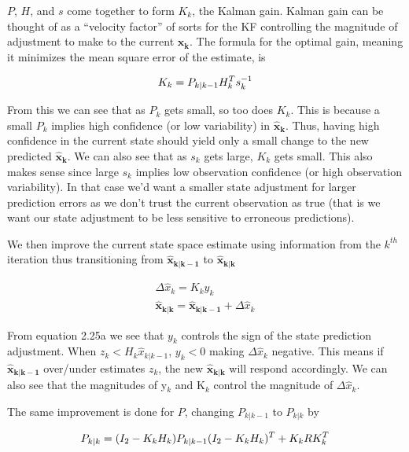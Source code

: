   $P$, $H$, and $s$ come together to form $K_{k}$, the Kalman gain. Kalman gain can be thought of as a ``velocity factor'' of sorts for the KF controlling the magnitude of adjustment to make to the current $\bm{\hat{x}_{k}}$. The formula for the optimal gain, meaning it minimizes the mean square error of the estimate, is  
  
    \begin{equation}
  \centering
    K_{k} = P_{k|k-1}H_{k}^{T}s_{k}^{-1}
  \end{equation}
  
  From this we can see that as $P_{k}$ gets small, so too does $K_{k}$. This is because a small $P_{k}$ implies high confidence (or low variability) in $\bm{\hat{x}_{k}}$. Thus, having high confidence in the current state should yield only a small change to the new predicted $\bm{\hat{x}_{k}}$. We can also see that as $s_{k}$ gets large, $K_{k}$ gets small. This also makes sense since large $s_{k}$ implies low observation confidence (or high observation variability). In that case we'd want a smaller state adjustment for larger prediction errors as we don't trust the current observation as true (that is we want our state adjustment to be less sensitive to erroneous predictions).
  
  We then improve the current state space estimate using information from the $k^{th}$ iteration thus transitioning from $\bm{\hat{x}_{k|k-1}}$ to $\bm{\hat{x}_{k|k}}$
  
  \begin{subequations}
  \begin{align}
    \Delta\hat{x}_{k} = K_{k}y_{k} \\
    \bm{\hat{x}_{k|k}} = \bm{\hat{x}_{k|k-1}} + \Delta\hat{x}_{k}
    \end{align}
   \end{subequations}

From equation 2.25a we see that $y_{k}$ controls the sign of the state prediction adjustment. When $z_{k} < H_{k}\hat{x}_{k|k-1}$, $y_{k} < 0$ making $\Delta\hat{x}_{k}$ negative. This means if $\bm{\hat{x}_{k|k-1}}$ over/under estimates $z_k$, the new $\bm{\hat{x}_{k|k}}$ will respond accordingly. We can also see that the magnitudes of y$_{k}$ and K$_{k}$ control the magnitude of $\Delta\hat{x}_{k}$.

The same improvement is done for $P$, changing $P_{k|k-1}$ to $P_{k|k}$ by

\begin{equation} 
\centering
P_{k|k} = (I_{2} - K_{k}H_{k})P_{k|k-1}(I_{2} - K_{k}H_{k})^{T} + K_{k}RK_{k}^{T}
\end{equation}

